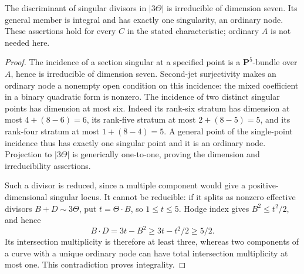 \begin{corollary}\label{cor:ppav-discriminant-one-node}
The discriminant of singular divisors in $|3\Theta|$ is irreducible
of dimension seven. Its general member is integral and has exactly
one singularity, an ordinary node. These assertions hold for every
$C$ in the stated characteristic; ordinary $A$ is not needed here.
\end{corollary}

\begin{proof}
The incidence of a section singular at a specified point is a
$\mathbf P^5$-bundle over $A$, hence is irreducible of dimension
seven. Second-jet surjectivity makes an ordinary node a nonempty
open condition on this incidence: the mixed coefficient in a
binary quadratic form is nonzero. The incidence of two distinct
singular points has dimension at most six. Indeed its rank-six
stratum has dimension at most $4+(8-6)=6$, its rank-five stratum
at most $2+(8-5)=5$, and its rank-four stratum at most
$1+(8-4)=5$. A general point of the single-point incidence thus
has exactly one singular point and it is an ordinary node.
Projection to $|3\Theta|$ is generically one-to-one, proving the
dimension and irreducibility assertions.

Such a divisor is reduced, since a multiple component would give
a positive-dimensional singular locus. It cannot be reducible:
if it splits as nonzero effective divisors $B+D\sim3\Theta$,
put $t=\Theta\cdot B$, so $1\le t\le5$. Hodge index gives
$B^2\le t^2/2$, and hence
\[
 B\cdot D=3t-B^2\ge 3t-t^2/2\ge5/2.
\]
Its intersection multiplicity is therefore at least three, whereas
two components of a curve with a unique ordinary node can have
total intersection multiplicity at most one. This contradiction
proves integrality.
\end{proof}

